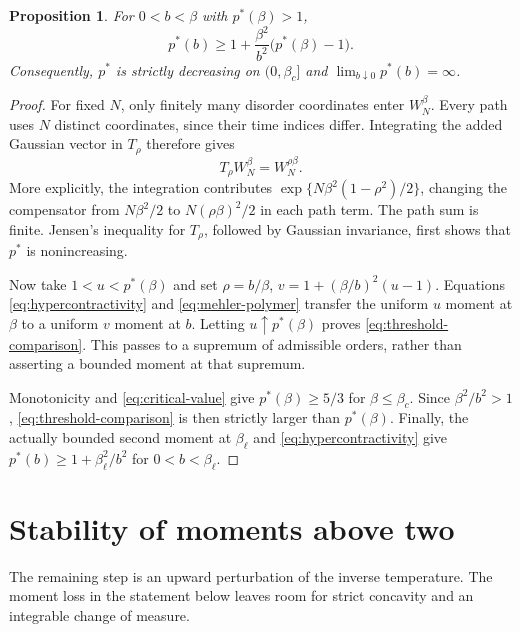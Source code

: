 \documentclass[11pt]{amsart}
\newcommand{\ps}{p^*}
\newtheorem{proposition}[theorem]{Proposition}
\theoremstyle{remark}
\numberwithin{equation}{section}
\begin{document}
\begin{proposition}\label{prop:comparison}
For $0<b<\beta$ with $\ps(\beta)>1$,
\begin{equation}\label{eq:threshold-comparison}
 \ps(b)\ge1+\frac{\beta^2}{b^2}\bigl(\ps(\beta)-1\bigr).
\end{equation}
Consequently, $\ps$ is strictly decreasing on $(0,\beta_c]$ and
$\lim_{b\downarrow0}\ps(b)=\infty$.
\end{proposition}

\begin{proof}
For fixed $N$, only finitely many disorder coordinates enter $W_N^\beta$.
Every path uses $N$ distinct coordinates, since their time indices differ.
Integrating the added Gaussian vector in $T_\rho$ therefore gives
\begin{equation}\label{eq:mehler-polymer}
 T_\rho W_N^\beta=W_N^{\rho\beta}.
\end{equation}
More explicitly, the integration contributes
$\exp\{N\beta^2(1-\rho^2)/2\}$, changing the compensator from
$N\beta^2/2$ to $N(\rho\beta)^2/2$ in each path term. The path sum is finite.
Jensen's inequality for $T_\rho$, followed by Gaussian invariance, first shows
that $\ps$ is nonincreasing.

Now take $1<u<\ps(\beta)$ and set $\rho=b/\beta$,
$v=1+(\beta/b)^2(u-1)$. Equations \eqref{eq:hypercontractivity} and
\eqref{eq:mehler-polymer} transfer the uniform $u$ moment at $\beta$ to a
uniform $v$ moment at $b$. Letting $u\uparrow\ps(\beta)$ proves
\eqref{eq:threshold-comparison}. This passes to a supremum of admissible
orders, rather than asserting a bounded moment at that supremum.

Monotonicity and \eqref{eq:critical-value} give
$\ps(\beta)\ge5/3$ for $\beta\le\beta_c$. Since $\beta^2/b^2>1$,
\eqref{eq:threshold-comparison} is then strictly larger than $\ps(\beta)$.
Finally, the actually bounded second moment at $\beta_\ell$ and
\eqref{eq:hypercontractivity} give
$\ps(b)\ge1+\beta_\ell^2/b^2$ for $0<b<\beta_\ell$.
\end{proof}

\section{Stability of moments above two}\label{sec:stability}

The remaining step is an upward perturbation of the inverse temperature.
The moment loss in the statement below leaves room for strict concavity and
an integrable change of measure.
\end{document}
